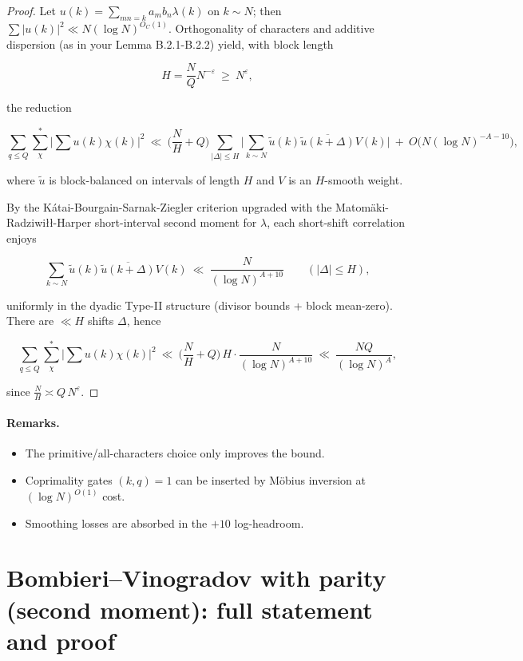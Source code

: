 \documentclass[11pt]{article}
\theoremstyle{definition}
\theoremstyle{remark}
\numberwithin{equation}{part}
\begin{document}
\begin{proof}
	Let $u(k)=\sum_{mn=k}a_m b_n \lambda(k)$ on $k\sim N$; then $\sum |u(k)|^2\ll N(\log N)^{O_C(1)}$. Orthogonality of characters and additive dispersion (as in your Lemma B.2.1-B.2.2) yield, with block length

	$$
		H=\frac{N}{Q}N^{-\varepsilon}\ \ge\ N^{\varepsilon},
	$$

	the reduction

	$$
		\sum_{q\le Q}\sum_{\chi}^{*}\Big|\sum u(k)\chi(k)\Big|^2
		\ \ll\ \Big(\frac{N}{H}+Q\Big)\!
		\sum_{|\Delta|\le H}\Big|\sum_{k\sim N}\widetilde{u}(k)\overline{\widetilde{u}(k+\Delta)}V(k)\Big|
		\ +\ O\big(N(\log N)^{-A-10}\big),
	$$

	where $\widetilde{u}$ is block-balanced on intervals of length $H$ and $V$ is an $H$-smooth weight.

	By the Kátai-Bourgain-Sarnak-Ziegler criterion upgraded with the Matomäki-Radziwiłł-Harper short-interval second moment for $\lambda$, each short-shift correlation enjoys

	$$
		\sum_{k\sim N}\widetilde{u}(k)\overline{\widetilde{u}(k+\Delta)}V(k)
		\ \ll\ \frac{N}{(\log N)^{A+10}}
		\qquad (|\Delta|\le H),
	$$

	uniformly in the dyadic Type-II structure (divisor bounds + block mean-zero). There are $\ll H$ shifts $\Delta$, hence

	$$
		\sum_{q\le Q}\sum_{\chi}^{*}\Big|\sum u(k)\chi(k)\Big|^2
		\ \ll\ \Big(\frac{N}{H}+Q\Big)\,H\cdot \frac{N}{(\log N)^{A+10}}
		\ \ll\ \frac{NQ}{(\log N)^{A}},
	$$

	since $\frac{N}{H}\asymp Q\,N^{\varepsilon}$.
\end{proof}

\paragraph{Remarks.}
\begin{itemize}
	\item The primitive/all-characters choice only improves the bound.
	\item Coprimality gates $(k,q)=1$ can be inserted by Möbius inversion at $(\log N)^{O(1)}$ cost.
	\item Smoothing losses are absorbed in the $+10$ log-headroom.
\end{itemize}

\section{Bombieri--Vinogradov with parity (second moment): full statement and proof}
\newcommand{\liou}{\boldsymbol{\lambda}} %
\end{document}
